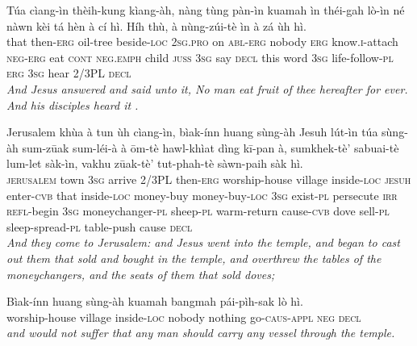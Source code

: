 \documentclass[11pt,a4paper]{article}
\begin{document}
\begin{exe}
\gll Túa cìang-ìn thèih-kung kìang-àh, nàng tùng pàn-ìn kuamah ìn théi-gah lò-ìn né nàwn kèi tá hèn à cí hì. Híh thù, à nùng-zúi-tè ìn à zá ùh hì. \\
     that then-\textsc{erg} oil-tree beside-\textsc{loc} \textsc{2sg}.\textsc{pro} on \textsc{abl}-\textsc{erg} nobody \textsc{erg} know.\textsc{i}-attach \textsc{neg}-\textsc{erg} eat \textsc{cont} \textsc{neg}.\textsc{emph} child \textsc{juss} \textsc{3sg} say \textsc{decl} this word \textsc{3sg} life-follow-\textsc{pl} \textsc{erg} \textsc{3sg} hear 2/3PL \textsc{decl} \\
\glt \textcolor{kjvcolor}{\textit{And Jesus answered and said unto it, No man eat fruit of thee hereafter for ever. And his disciples heard it .}}

\gll Jerusalem khùa à tun ùh cìang-ìn, bìak-ínn huang sùng-àh Jesuh lút-ìn túa sùng-àh sum-zūak sum-léi-à à ōm-tè hawl-khìat dìng kī-pan à, sumkhek-tè' sabuai-tè lum-let sàk-ìn, vakhu zūak-tè' tut-phah-tè sàwn-paih sàk hì. \\
     \textsc{jerusalem} town \textsc{3sg} arrive 2/3PL then-\textsc{erg} worship-house village inside-\textsc{loc} \textsc{jesuh} enter-\textsc{cvb} that inside-\textsc{loc} money-buy money-buy-\textsc{loc} \textsc{3sg} exist-\textsc{pl} persecute \textsc{irr} \textsc{refl}-begin \textsc{3sg} moneychanger-\textsc{pl} sheep-\textsc{pl} warm-return cause-\textsc{cvb} dove sell-\textsc{pl} sleep-spread-\textsc{pl} table-push cause \textsc{decl} \\
\glt \textcolor{kjvcolor}{\textit{And they come to Jerusalem: and Jesus went into the temple, and began to cast out them that sold and bought in the temple, and overthrew the tables of the moneychangers, and the seats of them that sold doves;}}

\gll Bìak-ínn huang sùng-àh kuamah bangmah pái-pìh-sak lò hì. \\
     worship-house village inside-\textsc{loc} nobody nothing go-\textsc{caus}-\textsc{appl} \textsc{neg} \textsc{decl} \\
\glt \textcolor{kjvcolor}{\textit{and would not suffer that any man should carry any vessel through the temple.}}


\end{exe}
\end{document}
